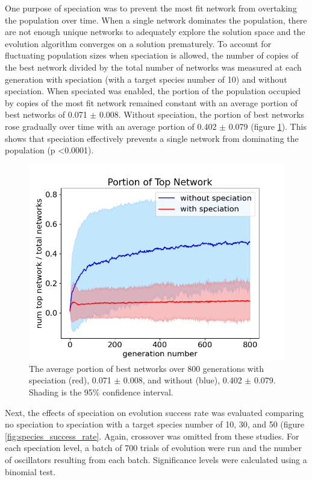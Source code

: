 \documentclass[12pt]{report}
\begin{document}
One purpose of speciation was to prevent the most fit network from overtaking the population over time. When a single network dominates the population, there are not enough unique networks to adequately explore the solution space and the evolution algorithm converges on a solution prematurely. To account for fluctuating population sizes when speciation is allowed, the number of copies of the best network divided by the total number of networks was measured at each generation with speciation (with a target species number of 10) and without speciation.  When speciated was enabled, the portion of the population occupied by copies of the most fit network
remained constant with an average portion of best networks of 0.071 $\pm$ 0.008. Without speciation, the portion of best networks rose gradually over time with an average portion of 0.402 $\pm$ 0.079 (figure \ref{fig:portion_best_network}). This shows that speciation effectively prevents a single network from dominating the population (p \textless 0.0001).

\begin{figure}
	\centering
    \includegraphics[width=18cm]{images/portion_best_network.png}
    \caption[Portion of top network over time, with and without speciation]{The average portion of best networks over 800 generations with speciation (red), 0.071 $\pm$ 0.008, and without (blue), 0.402 $\pm$ 0.079. Shading is the 95\% confidence interval.}
    \label{fig:portion_best_network}
\end{figure}


Next, the effects of speciation on evolution success rate was evaluated comparing no speciation to speciation with a target species number of 10, 30, and 50 (figure \ref{fig:species_success_rate}. Again, crossover was omitted from these studies. For each speciation level, a batch of 700 trials of evolution were run and the number of oscillators resulting from each batch. Significance levels were calculated using a binomial test. 
\end{document}
